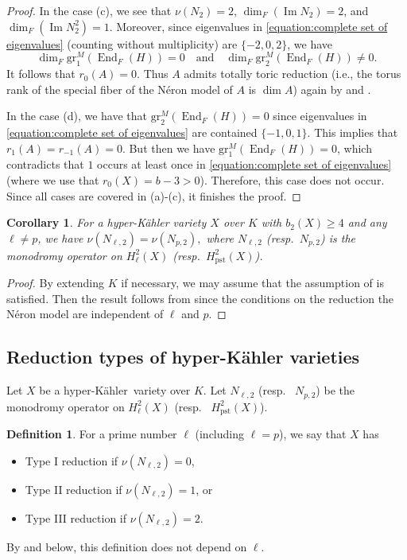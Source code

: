 \documentclass[12pt,reqno]{amsart}
\newtheorem{cor}[thm]{Corollary}
\theoremstyle{definition}
\newtheorem{defn}[thm]{Definition}
\newcommand\End{\mathop{\mathrm{End}}\nolimits}
\renewcommand\Im{\mathop{\mathrm{Im}}\nolimits}
\newcommand{\hk}{hyper-Kähler~}
\DeclareMathOperator{\pst}{pst}
\numberwithin{equation}{section}
\begin{document}
\begin{proof}
In the case (c),
we see that $\nu (N_{2}) = 2$, $\dim_{F} (\Im N_{2}) =2$, and
$\dim_{F} (\Im N^2_{2}) =1$.
Moreover, since eigenvalues in \eqref{equation:complete set of eigenvalues} 
(counting without multiplicity) are $\{-2,0,2\}$,
we have
\[
\dim_F \mathrm{gr}^M_1(\End_{F} (H))=0 \quad \text{and} \quad \dim_F \mathrm{gr}^M_2(\End_{F} (H)) \neq 0.
\]
It follows that $r_0(A)=0$.
Thus
$A$ admits totally toric reduction
(i.e., the torus rank of the special fiber of the Néron model of $A$ is $\dim A$) again by \cite[Expos\'e IX]{SGA7-I} and \cite[Part II, Proposition 4.5]{Coleman-Iovita}.


In the case (d),
we have that
$
\mathrm{gr}^M_2(\End_{F} (H))=0$
since eigenvalues in \eqref{equation:complete set of eigenvalues} are contained $\{-1,0,1\}$.
This implies that $r_{1}(A) =r_{-1}(A) =0$.
But then we have $\mathrm{gr}^M_1(\End_{F} (H)) = 0$, which contradicts that $1$ occurs at least once in \eqref{equation:complete set of eigenvalues} (where we use that $r_0(X)=b-3 > 0$).
Therefore, this case does not occur.
Since all cases are covered in (a)-(c), it finishes the proof.
\end{proof}

\begin{cor}
\label{cor:l-independence of nilpotency index}
For a hyper-Kähler variety $X$ over $K$ with $b_2(X) \geq 4$ and any $\ell \neq p$, we have
$
\nu(N_{\ell,2}) = \nu (N_{p,2}),
$
where $N_{\ell,2}$ (resp.~$N_{p,2}$) is the monodromy operator on 
$H^2_{\ell} (X)$ (resp.~$H^2_{\pst} (X)$).
\end{cor}
\begin{proof}
By extending $K$ if necessary, we may assume that the assumption of  is satisfied.
Then the result follows from  since the conditions on the reduction the Néron model are independent of $\ell$ and $p$.
\end{proof}



\subsection{Reduction types of hyper-Kähler varieties}\label{Subsection:Reduction types of hyper-Kähler varieties}

Let $X$ be a \hk variety over $K$. 
Let $N_{\ell,2}$ (resp.~ $N_{p,2}$) be the monodromy operator on 
$H^2_{\ell} (X)$ (resp.~ $H^2_{\pst} (X)$).

\begin{defn}\label{defn:Reduction Type at l}
For a prime number $\ell$ (including $\ell =p$), we say that $X$ has
\begin{itemize}
    \item Type I reduction if $\nu(N_{\ell,2}) =0$,
    \item Type II reduction if $\nu(N_{\ell,2}) =1$, or
    \item Type III reduction if $\nu(N_{\ell,2}) =2$.
\end{itemize}
By  and  below, this definition does not depend on $\ell$.
\end{defn}
\end{document}
